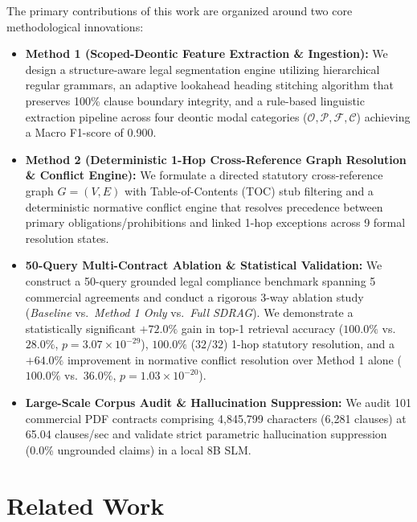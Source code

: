 \documentclass[conference]{IEEEtran}
\begin{document}
The primary contributions of this work are organized around two core methodological innovations:
\begin{itemize}
    \item \textbf{Method 1 (Scoped-Deontic Feature Extraction \& Ingestion):} We design a structure-aware legal segmentation engine utilizing hierarchical regular grammars, an adaptive lookahead heading stitching algorithm that preserves 100\% clause boundary integrity, and a rule-based linguistic extraction pipeline across four deontic modal categories ($\mathcal{O}, \mathcal{P}, \mathcal{F}, \mathcal{C}$) achieving a Macro F1-score of 0.900.
    \item \textbf{Method 2 (Deterministic 1-Hop Cross-Reference Graph Resolution \& Conflict Engine):} We formulate a directed statutory cross-reference graph $G = (V, E)$ with Table-of-Contents (TOC) stub filtering and a deterministic normative conflict engine that resolves precedence between primary obligations/prohibitions and linked 1-hop exceptions across 9 formal resolution states.
    \item \textbf{50-Query Multi-Contract Ablation \& Statistical Validation:} We construct a 50-query grounded legal compliance benchmark spanning 5 commercial agreements and conduct a rigorous 3-way ablation study (\textit{Baseline} vs.\ \textit{Method 1 Only} vs.\ \textit{Full SDRAG}). We demonstrate a statistically significant $+72.0\%$ gain in top-1 retrieval accuracy ($100.0\%$ vs.\ $28.0\%$, $p = 3.07 \times 10^{-29}$), $100.0\%$ ($32/32$) 1-hop statutory resolution, and a $+64.0\%$ improvement in normative conflict resolution over Method 1 alone ($100.0\%$ vs.\ $36.0\%$, $p = 1.03 \times 10^{-20}$).
    \item \textbf{Large-Scale Corpus Audit \& Hallucination Suppression:} We audit 101 commercial PDF contracts comprising 4,845,799 characters (6,281 clauses) at 65.04 clauses/sec and validate strict parametric hallucination suppression (0.0\% ungrounded claims) in a local 8B SLM.
\end{itemize}

\section{Related Work}
\end{document}
